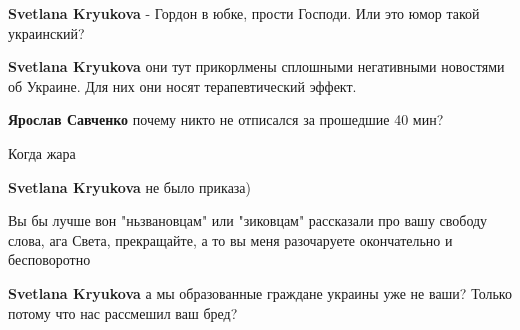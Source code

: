 \begin{itemize}
\begin{itemize}
\textbf{Svetlana Kryukova} - Гордон в юбке, прости Господи. Или это юмор такой украинский?

 
\textbf{Svetlana Kryukova} они тут прикорлмены сплошными негативными новостями об Украине. Для них они носят терапевтический эффект.


 
\textbf{Ярослав Савченко} почему никто не отписался за прошедшие 40 мин?

 
Когда жара

 
\textbf{Svetlana Kryukova} не было приказа)

 
Вы бы лучше вон "ньзвановцам" или "зиковцам" рассказали про вашу свободу слова,
ага \Laughey[1.0][white] Света, прекращайте, а то вы меня разочаруете окончательно и бесповоротно
🤣

 
\textbf{Svetlana Kryukova} а мы образованные граждане украины уже не ваши? Только потому что нас рассмешил ваш бред?

 

\end{itemize}
\end{itemize}
